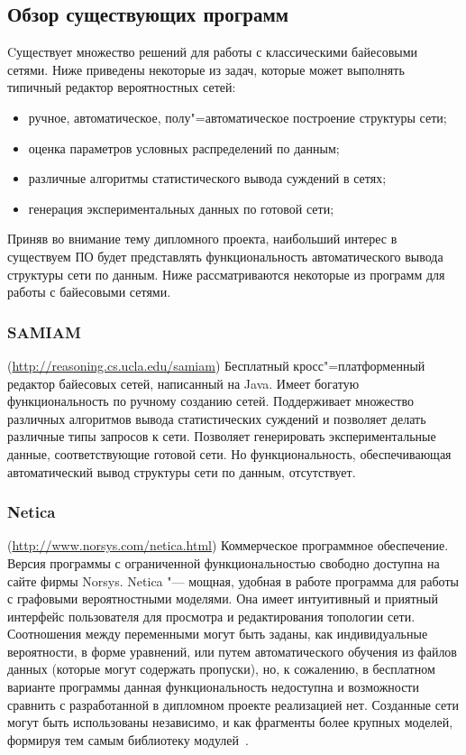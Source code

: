 \subsection{Обзор существующих программ} %
\label{sub:domain:existing_programs}
Cуществует множество решений для работы с классическими байесовыми сетями.
Ниже приведены некоторые из задач, которые может выполнять типичный редактор вероятностных сетей:
\begin{itemize}
  \item ручное, автоматическое, полу"=автоматическое построение структуры сети;
  \item оценка параметров условных распределений по данным;
  \item различные алгоритмы статистического вывода суждений в сетях;
  \item генерация экспериментальных данных по готовой сети;
\end{itemize}

Приняв во внимание тему дипломного проекта, наибольший интерес в существуем ПО будет представлять функциональность автоматического вывода структуры сети по данным.
Ниже рассматриваются некоторые из программ для работы с байесовыми сетями.

\subsubsection{SAMIAM }(\url{http://reasoning.cs.ucla.edu/samiam})
Бесплатный кросс"=платформенный редактор байесовых сетей, написанный на Java.
Имеет богатую функциональность по ручному созданию сетей.
Поддерживает множество различных алгоритмов вывода статистических суждений и позволяет делать различные типы запросов к сети.
Позволяет генерировать экспериментальные данные, соответствующие готовой сети.
Но функциональность, обеспечивающая автоматический вывод структуры сети по данным, отсутствует.

\subsubsection{Netica }(\url{http://www.norsys.com/netica.html})
Коммерческое программное обеспечение.
Версия программы с ограниченной функциональностью свободно доступна на сайте фирмы Norsys.
Netica "--- мощная, удобная в работе программа для работы с графовыми вероятностными моделями.
Она имеет интуитивный и приятный интерфейс пользователя для просмотра и редактирования топологии сети.
Соотношения между переменными могут быть заданы, как индивидуальные вероятности, в форме уравнений, или путем автоматического обучения из файлов данных (которые могут содержать пропуски), но, к сожалению, в бесплатном варианте программы данная функциональность недоступна и возможности сравнить с разработанной в дипломном проекте реализацией нет.
Созданные сети могут быть использованы независимо, и как фрагменты более крупных моделей, формируя тем самым библиотеку модулей~\cite{terehov_2003}.

